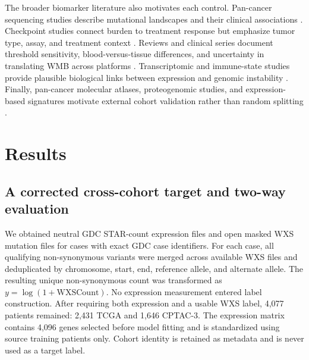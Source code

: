 \documentclass[11pt]{article}
\begin{document}
The broader biomarker literature also motivates each control. Pan-cancer sequencing studies describe mutational landscapes and their clinical associations \citep{A20181e9e4,PM202299bdd,Y202033ae9,TA2019c6103,R20183350e,BC20191812e,PS20205cb68,PM20181fbc2}. Checkpoint studies connect burden to treatment response but emphasize tumor type, assay, and treatment context \citep{F2021d1922,RS2020b4e8b,C20200d165,A2022816e6,G202190cac,YH202072c0b,H2018a0678,X20209c79a,AC2019b5978}. Reviews and clinical series document threshold sensitivity, blood-versus-tissue differences, and uncertainty in translating WMB across platforms \citep{LR2023dd859,J2018b4421,PY2020d45d6,H2019557b0,DL2021e47f7,AM201808061,EB201917903,PT2016dead7}. Transcriptomic and immune-state studies provide plausible biological links between expression and genomic instability \citep{DR201894b95,S2019d1269,F20241e1be,MD201820035,D20190effa,AL2020b5a9f,J2021c7974,A2023f2564}. Finally, pan-cancer molecular atlases, proteogenomic studies, and expression-based signatures motivate external cohort validation rather than random splitting \citep{CM20212afeb,K20219ece3,A20208c510,F20199dd64,SL20205ea48,R20195cc8a,AJ202033d96,WL202355f55}.

\section{Results}
\subsection{A corrected cross-cohort target and two-way evaluation}
We obtained neutral GDC STAR-count expression files and open masked WXS mutation files for cases with exact GDC case identifiers. For each case, all qualifying non-synonymous variants were merged across available WXS files and deduplicated by chromosome, start, end, reference allele, and alternate allele. The resulting unique non-synonymous count was transformed as $y=\log(1+\mathrm{WXSCount})$. No expression measurement entered label construction. After requiring both expression and a usable WXS label, 4,077 patients remained: 2,431 TCGA and 1,646 CPTAC-3. The expression matrix contains 4,096 genes selected before model fitting and is standardized using source training patients only. Cohort identity is retained as metadata and is never used as a target label.
\end{document}
